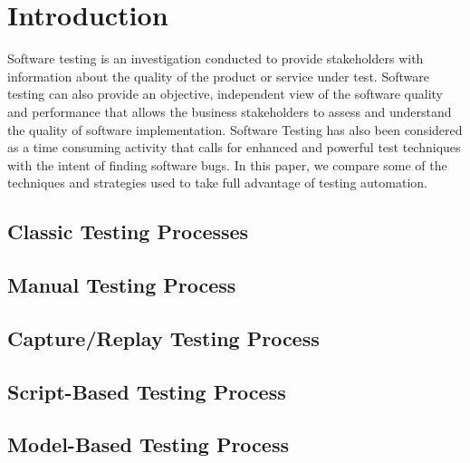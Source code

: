 \section{Introduction}

Software testing is an investigation conducted to provide stakeholders with information about the quality of the product or service under test. Software testing can also provide an objective, independent view of the software quality and performance that allows the business stakeholders to assess and understand the quality of software implementation. Software Testing has also been considered as a time consuming activity that calls for enhanced and powerful test techniques with the intent of finding software bugs. In this paper, we compare some of the techniques and strategies used to take full advantage of testing automation.

\subsection{Classic Testing Processes}
\subsection{Manual Testing Process}
\subsection{Capture/Replay Testing Process}
\subsection{Script-Based Testing Process}
\subsection{Model-Based Testing Process}
